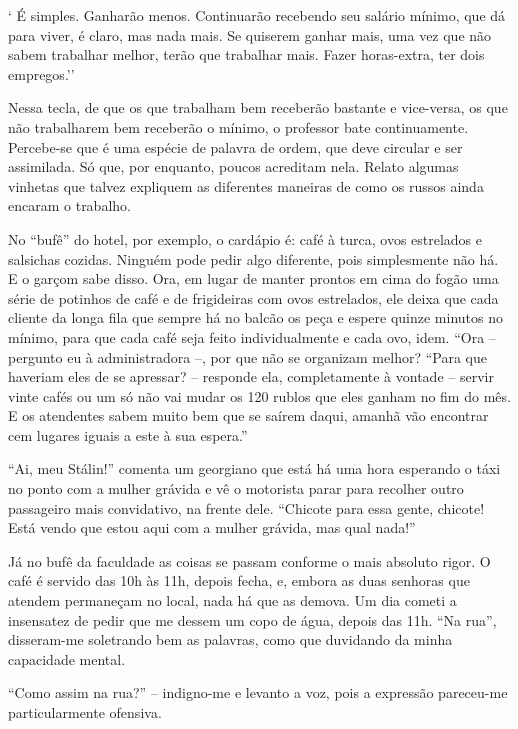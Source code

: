 ` É simples. Ganharão menos. Continuarão recebendo seu salário mínimo,
que dá para viver, é claro, mas nada mais. Se quiserem ganhar mais, uma
vez que não sabem trabalhar melhor, terão que trabalhar mais. Fazer
horas-extra, ter dois empregos.''

Nessa tecla, de que os que trabalham bem receberão bastante e
vice-versa, os que não trabalharem bem receberão o mínimo, o professor
bate continuamente. Percebe-se que é uma espécie de palavra de ordem,
que deve circular e ser assimilada. Só que, por enquanto, poucos
acreditam nela. Relato algumas vinhetas que talvez expliquem as
diferentes maneiras de como os russos ainda encaram o trabalho.

No ``bufê'' do hotel, por exemplo, o cardápio é: café à turca, ovos
estrelados e salsichas cozidas. Ninguém pode pedir algo diferente, pois
simplesmente não há. E o garçom sabe disso. Ora, em lugar de manter
prontos em cima do fogão uma série de potinhos de café e de frigideiras
com ovos estrelados, ele deixa que cada cliente da longa fila que sempre
há no balcão os peça e espere quinze minutos no mínimo, para que cada
café seja feito individualmente e cada ovo, idem. ``Ora -- pergunto eu à
administradora --, por que não se organizam melhor? ``Para que haveriam
eles de se apressar? -- responde ela, completamente à vontade -- servir
vinte cafés ou um só não vai mudar os 120 rublos que eles ganham no fim
do mês. E os atendentes sabem muito bem que se saírem daqui, amanhã vão
encontrar cem lugares iguais a este à sua espera.''

``Ai, meu Stálin!'' comenta um georgiano que está há uma hora esperando
o táxi no ponto com a mulher grávida e vê o motorista parar para
recolher outro passageiro mais convidativo, na frente dele. ``Chicote
para essa gente, chicote! Está vendo que estou aqui com a mulher
grávida, mas qual nada!''

Já no bufê da faculdade as coisas se passam conforme o mais absoluto
rigor. O café é servido das 10h às 11h, depois fecha, e, embora as duas
senhoras que atendem permaneçam no local, nada há que as demova. Um dia
cometi a insensatez de pedir que me dessem um copo de água, depois das
11h. ``Na rua'', disseram-me soletrando bem as palavras, como que
duvidando da minha capacidade mental.

``Como assim na rua?'' -- indigno-me e levanto a voz, pois a expressão
pareceu-me particularmente ofensiva.

